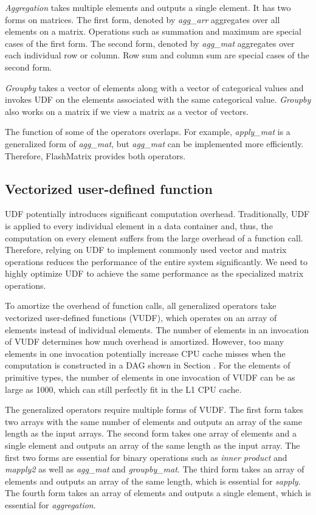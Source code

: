 \textit{Aggregation} takes multiple elements and outputs a single element.
It has two forms on matrices. The first form, denoted by \textit{agg\_arr}
aggregates over all elements on a matrix. Operations such as summation and
maximum are special cases of the first form. The second form, denoted by
\textit{agg\_mat} aggregates over each individual row or column.
Row sum and column sum are special cases of the second form.

\textit{Groupby} takes a vector of elements along with a vector of categorical
values and invokes UDF on the elements associated with the same categorical
value. \textit{Groupby} also works on a matrix if we view a matrix as a vector
of vectors.

The function of some of the operators overlaps. For example, \textit{apply\_mat}
is a generalized form of \textit{agg\_mat}, but \textit{agg\_mat} can be
implemented more efficiently. Therefore, FlashMatrix provides both operators.

\subsection{Vectorized user-defined function}
UDF potentially introduces significant computation overhead. Traditionally,
UDF is applied to every individual element in a data container and, thus,
the computation on every element suffers from the large overhead of a function
call. Therefore, relying on UDF to implement commonly used vector and matrix
operations reduces the performance of the entire system significantly.
We need to highly optimize UDF to achieve the same performance as
the specialized matrix operations.

To amortize the overhead of function calls, all generalized operators take
vectorized user-defined functions (VUDF), which operates on an array of elements
instead of individual elements. The number of elements in an invocation of
VUDF determines how much overhead is amortized. However, too many elements
in one invocation potentially increase CPU cache misses when the computation
is constructed in a DAG shown in Section {}. For the elements of primitive
types, the number of elements in one invocation of VUDF can be as large as 1000,
which can still perfectly fit in the L1 CPU cache.

The generalized operators require multiple forms of VUDF. The first form takes
two arrays with the same number of elements and outputs an array of the same
length as the input arrays. The second form takes one array of elements and
a single element and outputs an array of the same length as the input array.
The first two forms are essential for binary operations such as
\textit{inner product} and \textit{mapply2} as well as \textit{agg\_mat} and
\textit{groupby\_mat}.
The third form takes an array of elements and outputs an array of the same
length, which is essential for \textit{sapply}.
The fourth form takes an array of elements and outputs a single element,
which is essential for \textit{aggregation}.


